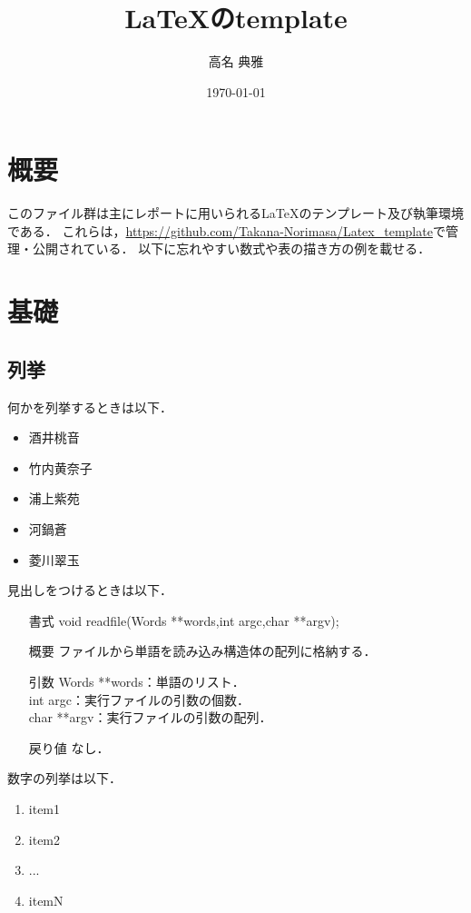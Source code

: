 \documentclass[12pt,a4paper,dvipdfmx]{jsarticle}
\title{\LaTeX のtemplate}
\author{高名 典雅}
\date{\today}
\begin{document}
\maketitle
{}

%

\section{概要}
このファイル群は主にレポートに用いられる\LaTeX のテンプレート及び執筆環境である．
これらは，\url{https://github.com/Takana-Norimasa/Latex_template}で管理・公開されている．
以下に忘れやすい数式や表の描き方の例を載せる．

\section{基礎}

\subsection{列挙}
何かを列挙するときは以下．
\begin{itemize}
    \item 酒井桃音
    \item 竹内黄奈子
    \item 浦上紫苑
    \item 河鍋蒼
    \item 菱川翠玉
\end{itemize}

見出しをつけるときは以下．
\begin{itemize}
    \item[書式] void readfile(Words **words,int argc,char **argv);
    \item[概要] ファイルから単語を読み込み構造体の配列に格納する．
    \item[引数] Words **words：単語のリスト．\\
                int argc：実行ファイルの引数の個数．\\
                char **argv：実行ファイルの引数の配列．
    \item[戻り値] なし．
\end{itemize}

数字の列挙は以下．
\begin{enumerate}
  \item item1
  \item item2
  \item ...
  \item itemN
\end{enumerate}
\end{document}
